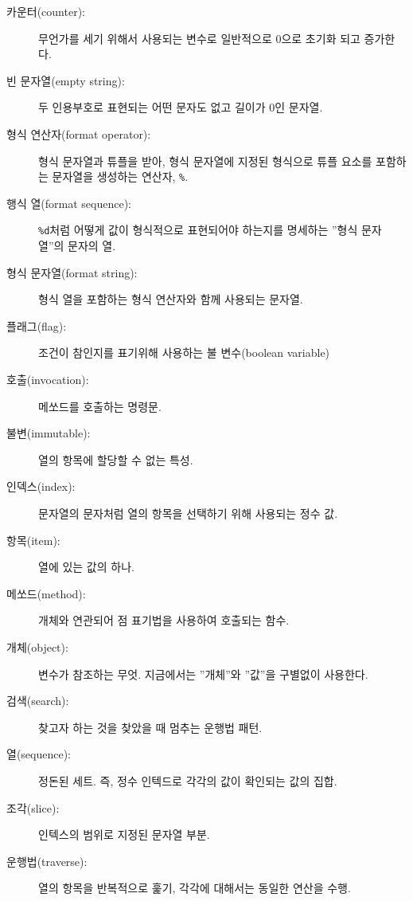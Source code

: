 \begin{description}

\item[카운터(counter):] 무언가를 세기 위해서 사용되는 변수로 일반적으로 0으로 초기화 되고 증가한다.

\item[빈 문자열(empty string):] 두 인용부호로 표현되는 어떤 문자도 없고 길이가 0인 문자열.

\item[형식 연산자(format operator):] 
형식 문자열과 튜플을 받아, 형식 문자열에 지정된 형식으로 튜플 요소를 포함하는 문자열을 생성하는 연산자, {\tt \%}.

\item[행식 열(format sequence):] 
{\tt \%d}처럼 어떻게 값이 형식적으로 표현되어야 하는지를 명세하는 ''형식 문자열''의 문자의 열. 

\item[형식 문자열(format string):] 형식 열을 포함하는 형식 연산자와 함께 사용되는 문자열.

\item[플래그(flag):] 조건이 참인지를 표기위해 사용하는 불 변수(boolean variable)

\item[호출(invocation):] 메쏘드를 호출하는 명령문.

\item[불변(immutable):] 열의 항목에 할당할 수 없는 특성.

\item[인덱스(index):] 문자열의 문자처럼 열의 항목을 선택하기 위해 사용되는 정수 값.

\item[항목(item):] 열에 있는 값의 하나.

\item[메쏘드(method):] 개체와 연관되어 점 표기법을 사용하여 호출되는 함수.

\item[개체(object):] 변수가 참조하는 무엇. 지금에서는 ''개체''와 ''값''을 구별없이 사용한다.

\item[검색(search):] 찾고자 하는 것을 찾았을 때 멈추는 운행법 패턴.

\item[열(sequence):] 정돈된 세트. 즉, 정수 인텍드로 각각의 값이 확인되는 값의 집합.

\item[조각(slice):] 인텍스의 범위로 지정된 문자열 부분.

\item[운행법(traverse):] 열의 항목을 반복적으로 훑기, 각각에 대해서는 동일한 연산을 수행.

\end{description}


